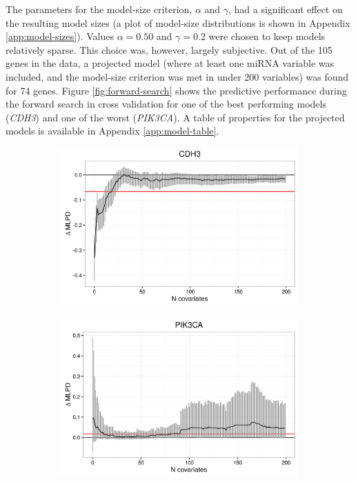 The parameters for the model-size criterion, $\alpha$ and $\gamma$, had a
significant effect on the resulting model sizes (a plot of model-size
distributions is shown in Appendix \ref{app:model-sizes}).
Values $\alpha = 0.50$ and $\gamma = 0.2$ were chosen to keep models
relatively sparse. This choice was, however, largely subjective. Out of the
105 genes in the data, a projected model (where at least one miRNA variable
was included, and the model-size criterion was met in under 200 variables) was
found for 74 genes. Figure \ref{fig:forward-search} shows the predictive performance during the
forward search in cross validation for one of the best performing models (\emph{CDH3})
and one of the worst (\emph{PIK3CA}).
A table of properties for the projected models is
available in Appendix \ref{app:model-table}.

\begin{figure}[!h]
  \centering
  \begin{subfigure}{.45\textwidth}
    \includegraphics[width=1\linewidth]{figures/CDH3_CV_path.png}
  \end{subfigure}
  \begin{subfigure}{.45\textwidth}
    \includegraphics[width=1\linewidth]{figures/PIK3CA_CV_path.png}
  \end{subfigure}


\end{figure}
